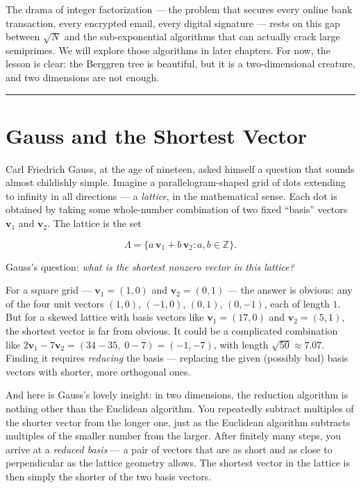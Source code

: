 The drama of integer factorization --- the problem that secures every online bank transaction, every encrypted email, every digital signature --- rests on this gap between \(\sqrt{N}\) and the sub-exponential algorithms that can actually crack large semiprimes. We will explore those algorithms in later chapters. For now, the lesson is clear: the Berggren tree is beautiful, but it is a two-dimensional creature, and two dimensions are not enough.

\bigskip\noindent\rule{\linewidth}{0.4pt}\bigskip

\section{Gauss and the Shortest Vector}
Carl Friedrich Gauss, at the age of nineteen, asked himself a question that sounds almost childishly simple. Imagine a parallelogram-shaped grid of dots extending to infinity in all directions --- a \emph{lattice}, in the mathematical sense. Each dot is obtained by taking some whole-number combination of two fixed ``basis'' vectors \(\mathbf{v}_1\) and \(\mathbf{v}_2\). The lattice is the set

\[
\Lambda = \{a\,\mathbf{v}_1 + b\,\mathbf{v}_2 : a, b \in \mathbb{Z}\}.
\]

Gauss's question: \emph{what is the shortest nonzero vector in this lattice?}

For a square grid --- \(\mathbf{v}_1 = (1, 0)\) and \(\mathbf{v}_2 = (0, 1)\) --- the answer is obvious: any of the four unit vectors \((1,0)\), \((-1,0)\), \((0,1)\), \((0,-1)\), each of length \(1\). But for a skewed lattice with basis vectors like \(\mathbf{v}_1 = (17, 0)\) and \(\mathbf{v}_2 = (5, 1)\), the shortest vector is far from obvious. It could be a complicated combination like \(2\mathbf{v}_1 - 7\mathbf{v}_2 = (34 - 35,\; 0 - 7) = (-1, -7)\), with length \(\sqrt{50} \approx 7.07\). Finding it requires \emph{reducing} the basis --- replacing the given (possibly bad) basis vectors with shorter, more orthogonal ones.

And here is Gauss's lovely insight: in two dimensions, the reduction algorithm is nothing other than the Euclidean algorithm. You repeatedly subtract multiples of the shorter vector from the longer one, just as the Euclidean algorithm subtracts multiples of the smaller number from the larger. After finitely many steps, you arrive at a \emph{reduced basis} --- a pair of vectors that are as short and as close to perpendicular as the lattice geometry allows. The shortest vector in the lattice is then simply the shorter of the two basis vectors.


